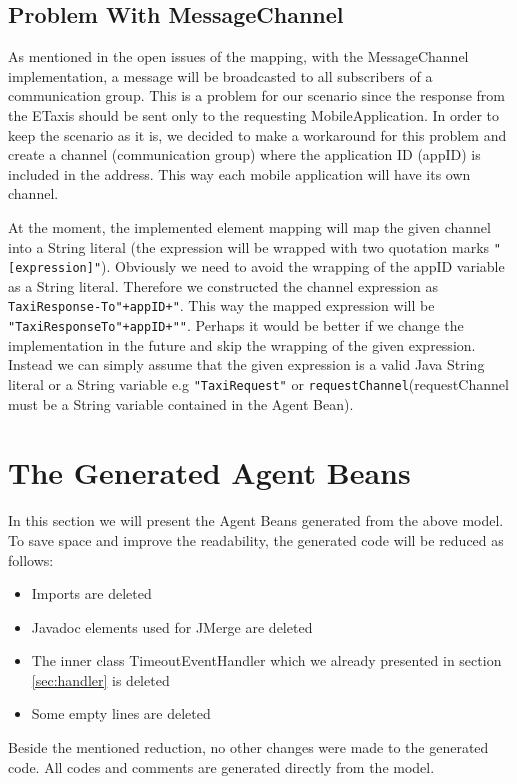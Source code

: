 \subsection{Problem With MessageChannel}
As mentioned in the open issues of the mapping, with the MessageChannel implementation, a message will be broadcasted to all subscribers of a communication group. This is a problem for our scenario since the response from the ETaxis should be sent only to the requesting MobileApplication. In order to keep the scenario as it is, we decided to make a workaround for this problem and create a channel (communication group) where the application ID (appID) is included in the address. This way each mobile application will have its own channel. 

\newpage
At the moment, the implemented element mapping will map the given channel into a String literal (the expression will be wrapped with two quotation marks \verb|"[expression]"|). Obviously we need to avoid the wrapping of the appID variable as a String literal. Therefore we constructed the channel expression as \verb|TaxiResponse-To"+appID+"|. This way the mapped expression will be \verb|"TaxiResponseTo"+appID+""|. Perhaps it would be better if we change the implementation in the future and skip the wrapping of the given expression. Instead we can simply assume that the given expression is a valid Java String literal or a String variable e.g \verb|"TaxiRequest"| or \verb|requestChannel|(requestChannel must be a String variable contained in the Agent Bean).

\section{The Generated Agent Beans}
In this section we will present the Agent Beans generated from the above model. To save space and improve the readability, the generated code will be reduced as follows:
\begin{itemize}
	\item Imports are deleted
	\item Javadoc elements used for JMerge are deleted
	\item The inner class TimeoutEventHandler which we already presented in section \ref{sec:handler} is deleted
	\item Some empty lines are deleted
\end{itemize}
Beside the mentioned reduction, no other changes were made to the generated code. All codes and comments are generated directly from the model.

